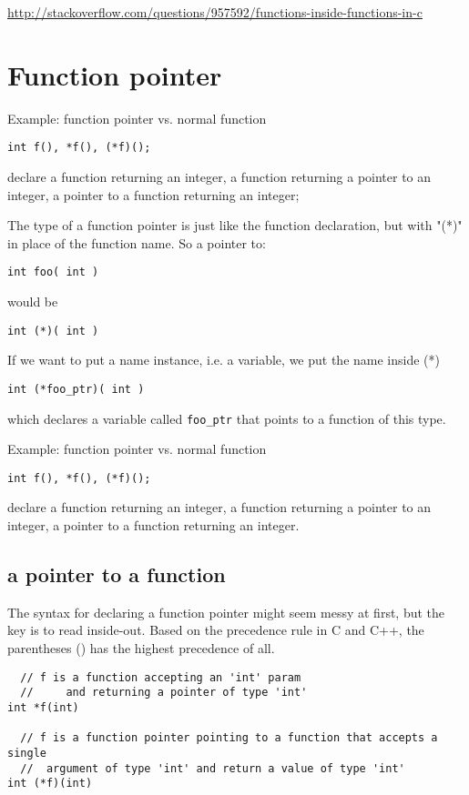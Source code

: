 \url{http://stackoverflow.com/questions/957592/functions-inside-functions-in-c}

\section{Function pointer}
\label{sec:function_pointer}

Example: function pointer vs. normal function
\begin{lstlisting}
int f(), *f(), (*f)();
\end{lstlisting}
declare a function returning an integer, a function returning a pointer to an
integer, a pointer to a function returning an integer; 


The type of a function pointer is just like the function declaration, but with
"(*)" in place of the function name. So a pointer to:
\begin{verbatim}
int foo( int )
\end{verbatim}
would be
\begin{verbatim}
int (*)( int )
\end{verbatim}
If we want to put a name instance, i.e. a variable, we put the name inside (*)
\begin{verbatim}
int (*foo_ptr)( int )
\end{verbatim}
which declares a variable called \verb!foo_ptr! that points to a function of this type.


Example: function pointer vs. normal function
\begin{lstlisting}
int f(), *f(), (*f)();
\end{lstlisting}
declare a function returning an integer, a function returning a pointer to an
integer, a pointer to a function returning an integer.

\subsection{a pointer to a function}

The syntax for declaring a function pointer might seem messy at first, but
the key is to read inside-out. Based on the precedence rule in C and C++, the
parentheses () has the highest precedence of all.
\begin{verbatim}
  // f is a function accepting an 'int' param
  //     and returning a pointer of type 'int' 
int *f(int)

  // f is a function pointer pointing to a function that accepts a single
  //  argument of type 'int' and return a value of type 'int' 
int (*f)(int) 
\end{verbatim}

